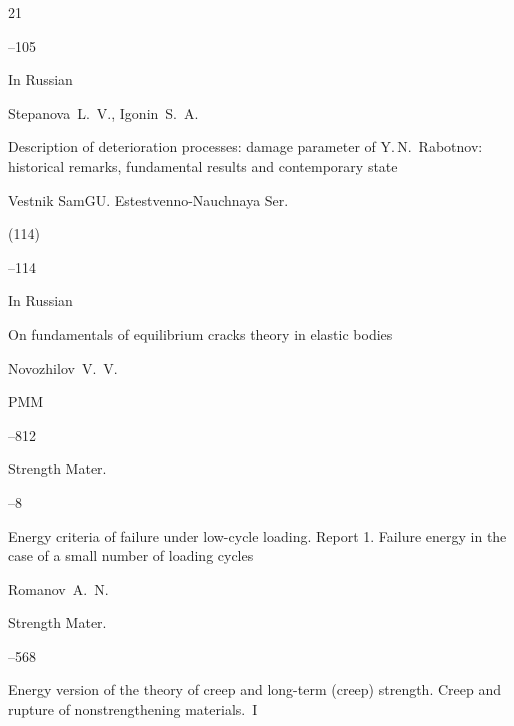 \begin{thebibliography}{21}

--105





\lang In Russian

\by Stepanova~L.~V., Igonin~S.~A.

\paper Description of deterioration processes: damage parameter of Y.\,N.~Rabotnov: historical remarks, fundamental results and contemporary state

\jour Vestnik SamGU. Estestvenno-Nauchnaya Ser.


(114)

--114




\lang In Russian

\paper  On fundamentals of equilibrium cracks theory in elastic bodies

\by Novozhilov~V.~V.

\jour PMM



--812






\jour  Strength Mater.




–8

\paper Energy criteria of failure under low-cycle loading. Report 1. Failure energy in the case of a small number of loading cycles

\by  Romanov~A.~N.







\jour  Strength Mater.




–568

\paper Energy version of the theory of creep and long-term (creep) strength. Creep and rupture of nonstrengthening materials.~I


\end{thebibliography}
